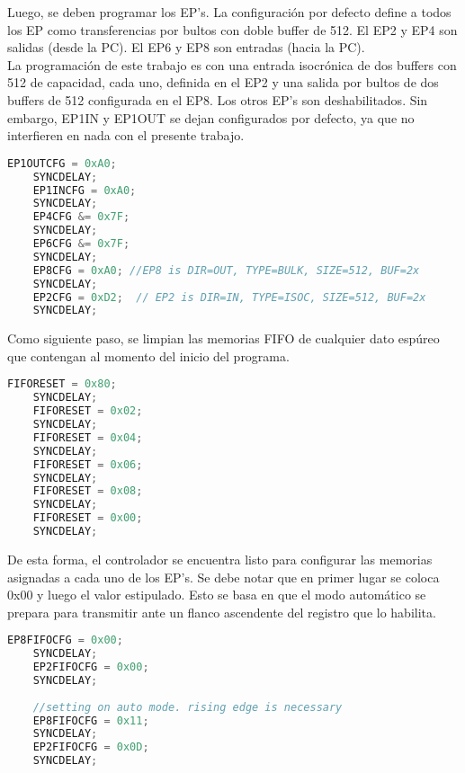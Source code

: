 	Luego, se deben programar los EP's. La configuración por defecto define a todos los EP como transferencias por bultos con doble buffer de \SI{512}{\byte}. El EP2 y EP4 son salidas (desde la PC). El EP6 y EP8 son entradas (hacia la PC).\\
	
	La programación de este trabajo es con una entrada isocrónica de dos buffers con \SI{512}{\byte} de capacidad, cada uno, definida en el EP2 y una salida por bultos de dos buffers de \SI{512}{\byte} configurada en el EP8. Los otros EP's son deshabilitados. Sin embargo, EP1IN y EP1OUT se dejan configurados por defecto, ya que no interfieren en nada con el presente trabajo.
	
%	
	\begin{lstlisting}[language=C,backgroundcolor=\color{gray!30}]
	EP1OUTCFG = 0xA0;
	SYNCDELAY;
	EP1INCFG = 0xA0;
	SYNCDELAY;
	EP4CFG &= 0x7F;
	SYNCDELAY;
	EP6CFG &= 0x7F;
	SYNCDELAY;
	EP8CFG = 0xA0; //EP8 is DIR=OUT, TYPE=BULK, SIZE=512, BUF=2x
	SYNCDELAY;
	EP2CFG = 0xD2;  // EP2 is DIR=IN, TYPE=ISOC, SIZE=512, BUF=2x
	SYNCDELAY;
	\end{lstlisting}
	
	Como siguiente paso, se limpian las memorias FIFO de cualquier dato espúreo que contengan al momento del inicio del programa.
	
	\begin{lstlisting}[language=C,backgroundcolor=\color{gray!30}]
	FIFORESET = 0x80;
	SYNCDELAY;
	FIFORESET = 0x02;
	SYNCDELAY;
	FIFORESET = 0x04;
	SYNCDELAY;
	FIFORESET = 0x06;
	SYNCDELAY;
	FIFORESET = 0x08;
	SYNCDELAY;
	FIFORESET = 0x00;
	SYNCDELAY;
	\end{lstlisting}
	
	De esta forma, el controlador se encuentra listo para configurar las memorias asignadas a cada uno de los EP's. Se debe notar que en primer lugar se coloca 0x00 y luego el valor estipulado. Esto se basa en que el modo automático se prepara para transmitir ante un flanco ascendente del registro que lo habilita.
	
%	
	\begin{lstlisting}[language=C,backgroundcolor=\color{gray!30}]
	EP8FIFOCFG = 0x00;
	SYNCDELAY;
	EP2FIFOCFG = 0x00;
	SYNCDELAY;
	
	//setting on auto mode. rising edge is necessary
	EP8FIFOCFG = 0x11;
	SYNCDELAY;
	EP2FIFOCFG = 0x0D;
	SYNCDELAY;
	\end{lstlisting}

